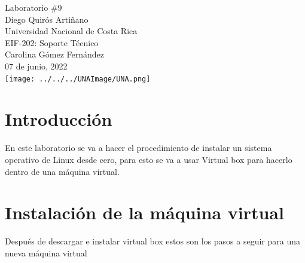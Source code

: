 \documentclass[stu, 12pt, letterpaper, donotrepeattitle, floatsintext, natbib, helv]{apa7}
\begin{document}
\begin{titlepage}
    \centering
    \vfill
    \LARGE Laboratorio \#9\\
    \vskip2cm
    \large Diego Quirós Artiñano \\
    Universidad Nacional de Costa Rica \\
    EIF-202: Soporte Técnico \\ 
    Carolina Gómez Fernández \\
    07 de junio, 2022 \\
    \vfill
    \texttt{[image: ../../../UNAImage/UNA.png]} \\
    \vfill
    \vfill
\end{titlepage}

\addto{}
\tableofcontents
\setcounter{tocdepth}{2}
\newpage
\renewcommand{\listfigurename}{\largeÍndice de fíguras}
\listoffigures
\newpage


\section*{Introducción}
{}
En este laboratorio se va a hacer el procedimiento de instalar un sistema operativo de Linux desde cero, para esto se va a usar Virtual box para hacerlo dentro de una máquina virtual.

\section*{Instalación de la máquina virtual}
{}
Después de descargar e instalar virtual box estos son los pasos a seguir para una nueva máquina virtual
\end{document}
